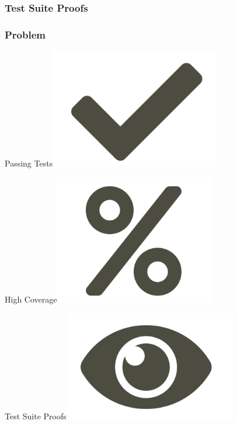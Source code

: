 \subsubsection{Test Suite Proofs}
%
%
\begin{frame}
	\frametitle{Problem}
		\huge{Passing Tests}\hfill\includegraphics[scale = 0.25]{images/check.png}

		\huge{High Coverage}\hfill\includegraphics[scale = 0.23]{images/percent.png}

		\huge{Test Suite Proofs}\hfill\includegraphics[scale = 0.25]{images/eye.png}
\end{frame}
